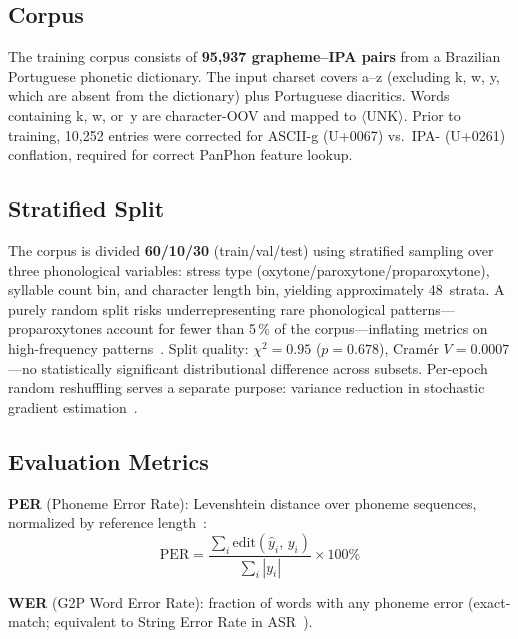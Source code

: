 \documentclass[conference]{IEEEtran}
\begin{document}
\subsection{Corpus}

The training corpus consists of \textbf{95{,}937 grapheme--IPA pairs}
from a Brazilian Portuguese phonetic dictionary.
The input charset covers a--z (excluding k, w, y, which are absent
from the dictionary) plus Portuguese diacritics.
Words containing k, w, or~y are character-OOV and mapped to
$\langle$UNK$\rangle$.
Prior to training, 10{,}252 entries were corrected for ASCII-g
(U+0067) vs.\ IPA- (U+0261) conflation, required for
correct PanPhon feature lookup.

\subsection{Stratified Split}

The corpus is divided \textbf{60/10/30} (train/val/test) using
stratified sampling over three phonological variables: stress type
(oxy\-tone/paroxytone/proparoxytone), syllable count bin, and
character length bin, yielding approximately 48~strata.
A purely random split risks underrepresenting rare phonological
patterns---proparoxytones account for fewer than 5\,\% of the
corpus---inflating metrics on high-frequency
patterns~\cite{kohavi1995crossvalidation}.
Split quality: $\chi^2\!=\!0.95$ ($p\!=\!0.678$),
Cram\'{e}r $V\!=\!0.0007$---no statistically significant
distributional difference across subsets.
Per-epoch random reshuffling serves a separate purpose: variance
reduction in stochastic gradient estimation~\cite{bottou2010large}.

\subsection{Evaluation Metrics}

\textbf{PER} (Phoneme Error Rate): Levenshtein distance over phoneme
sequences, normalized by reference length~\cite{bisani2008joint}:
\begin{equation}
  \mathrm{PER} = \frac{\displaystyle\sum_i \mathrm{edit}(\hat{y}_i,\,
                 y_i)}{\displaystyle\sum_i |y_i|} \times 100\%
  \label{eq:per}
\end{equation}

\textbf{WER} (G2P Word Error Rate): fraction of words with any
phoneme error (exact-match; equivalent to String Error Rate in
ASR~\cite{bisani2008joint}).
\end{document}
